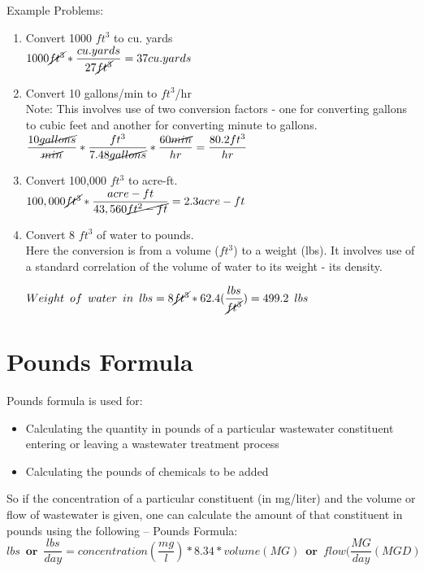 Example Problems:\\
\begin{enumerate}
\item Convert 1000 $ft^3$ to cu. yards\\

$1000 \cancel{ft^3}*\dfrac{cu.yards}{27\cancel{ft^3}} = 37 cu.yards$

\item Convert 10 gallons/min to $ft^3$/hr\\
Note:  This involves use of two conversion factors - one for converting gallons to cubic feet and another for converting minute to gallons.\\ 
$\dfrac{10 \cancel{gallons}}{\cancel{min}}*  \dfrac{ft^3}{7.48 \cancel{gallons}}  * \dfrac{60 \cancel{min}}{hr}   = \dfrac{80.2ft^3}{hr}$


\item Convert 100,000 $ft^3$ to acre-ft.\\
$100,000 \cancel{ft^3} * \dfrac{acre-ft}{43,560 \cancel{ft^2-ft}} =  2.3 acre-ft$\\

\item Convert 8 $ft^3$ of water to pounds.\\
Here the conversion is from a volume ($ft^3$) to a weight (lbs).  It involves use of a standard correlation of the volume of water to its weight - its density. 

$Weight \enspace of \enspace water \enspace in \enspace lbs=8 \cancel{ft^3} *   62.4  (\dfrac{lbs}{\cancel{ft^3}}) = 499.2 \enspace lbs $\\

\end{enumerate}

\section{Pounds Formula}



Pounds formula is used for:
\begin{itemize}
\item Calculating the quantity in pounds of a particular wastewater constituent entering or leaving a wastewater treatment process
\item Calculating the pounds of chemicals to be added\\
\end{itemize}
So if the concentration of a particular constituent (in mg/liter) and the volume or flow of wastewater is given, one can calculate the amount of that constituent in pounds using the following – Pounds Formula:
$$lbs \enspace \textbf{or} \enspace \dfrac{lbs}{day}=concentration(\dfrac{mg}{l})*8.34*volume(MG) \enspace \textbf{or} \enspace flow(\dfrac{MG}{day}(MGD)$$

